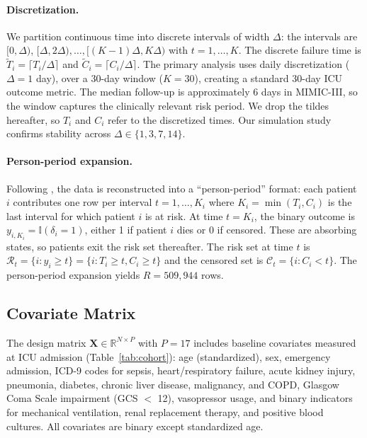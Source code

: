 \documentclass[twoside,11pt]{article}
\newcommand{\ind}{\mathbb{I}}
\begin{document}
\paragraph{Discretization.}
We partition continuous time into discrete intervals of width \(\Delta\): the intervals are \([0,\Delta)\), \([\Delta, 2\Delta), \dots, [(K-1)\Delta, K\Delta)\) with \(t = 1, \dots, K\). The discrete failure time is \(\tilde{T}_i = \lceil T_i / \Delta \rceil\) and \(\tilde{C}_i = \lceil C_i / \Delta \rceil\). The primary analysis uses daily discretization (\(\Delta = 1\) day), over a 30-day window (\(K = 30\)), creating a standard 30-day ICU outcome metric. The median follow-up is approximately 6 days in MIMIC-III, so the window captures the clinically relevant risk period. We drop the tildes hereafter, so $T_i$ and $C_i$ refer to the discretized times. Our simulation study confirms stability across $\Delta \in \{1, 3, 7, 14\}$.
 
\paragraph{Person-period expansion.}
Following \citet{allison-discrete}, the data is reconstructed into a ``person-period'' format: each patient $i$ contributes one row per interval $t = 1, \dots, K_i$ where $K_i = \min(T_i, C_i)$ is the last interval for which patient $i$ is at risk. At time $t = K_i$, the binary outcome is $y_{i,K_i} = \ind(\delta_i = 1)$, either 1 if patient $i$ dies or 0 if censored. These are absorbing states, so patients exit the risk set thereafter. The risk set at time $t$ is $\mathcal{R}_t = \{i: y_i \ge t\} = \{i: T_i \ge t, C_i \ge t\}$ and the censored set is $\mathcal{C}_t = \{i: C_i < t\}$. The person-period expansion yields $R = 509,944$ rows.
 
\subsection{Covariate Matrix}\label{sc:covariates}
The design matrix $\mathbf{X}\in \mathbb{R}^{N \times P}$ with $P = 17$ includes baseline covariates measured at ICU admission (Table~\ref{tab:cohort}): age (standardized), sex, emergency admission, ICD-9 codes for sepsis, heart/respiratory failure, acute kidney injury, pneumonia, diabetes, chronic liver disease, malignancy, and COPD, Glasgow Coma Scale impairment (GCS $<$ 12), vasopressor usage, and binary indicators for mechanical ventilation, renal replacement therapy, and positive blood cultures. All covariates are binary except standardized age.
 
\end{document}
